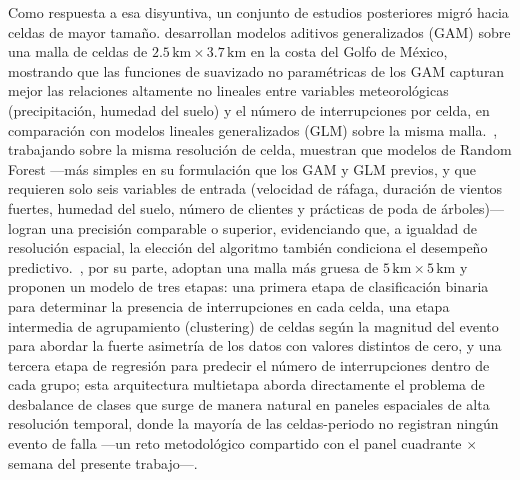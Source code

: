 Como respuesta a esa disyuntiva, un conjunto de estudios posteriores migró hacia celdas de mayor tamaño. \textcite{ref41} desarrollan modelos aditivos generalizados (GAM) sobre una malla de celdas de $2.5\,\text{km}\times 3.7\,\text{km}$ en la costa del Golfo de México, mostrando que las funciones de suavizado no paramétricas de los GAM capturan mejor las relaciones altamente no lineales entre variables meteorológicas (precipitación, humedad del suelo) y el número de interrupciones por celda, en comparación con modelos lineales generalizados (GLM) sobre la misma malla.~\cite{ref37}, trabajando sobre la misma resolución de celda, muestran que modelos de Random Forest —más simples en su formulación que los GAM y GLM previos, y que requieren solo seis variables de entrada (velocidad de ráfaga, duración de vientos fuertes, humedad del suelo, número de clientes y prácticas de poda de árboles)— logran una precisión comparable o superior, evidenciando que, a igualdad de resolución espacial, la elección del algoritmo también condiciona el desempeño predictivo.~\cite{ref42}, por su parte, adoptan una malla más gruesa de $5\,\text{km}\times 5\,\text{km}$ y proponen un modelo de tres etapas: una primera etapa de clasificación binaria para determinar la presencia de interrupciones en cada celda, una etapa intermedia de agrupamiento (clustering) de celdas según la magnitud del evento para abordar la fuerte asimetría de los datos con valores distintos de cero, y una tercera etapa de regresión para predecir el número de interrupciones dentro de cada grupo; esta arquitectura multietapa aborda directamente el problema de desbalance de clases que surge de manera natural en paneles espaciales de alta resolución temporal, donde la mayoría de las celdas-periodo no registran ningún evento de falla —un reto metodológico compartido con el panel cuadrante $\times$ semana del presente trabajo—.

